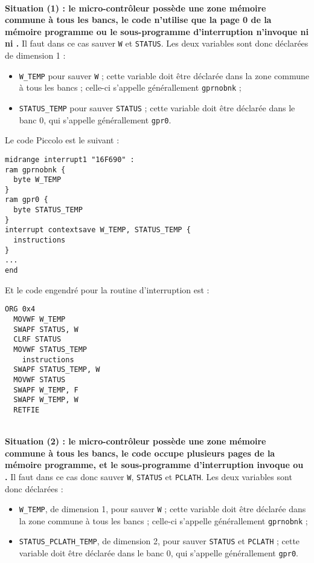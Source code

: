 ~\\
\textbf{Situation (1) : le micro-contrôleur possède une zone mémoire commune à tous les bancs, le code n'utilise que la page 0 de la mémoire programme ou le sous-programme d'interruption n'invoque ni  ni .} Il faut dans ce cas sauver \texttt{W} et \texttt{STATUS}. Les deux variables sont donc déclarées de dimension 1 :
\begin{itemize}
  \item \texttt{W\_TEMP} pour sauver \texttt{W} ; cette variable doit être déclarée dans la zone commune à tous les bancs ; celle-ci s'appelle générallement \texttt{gprnobnk} ; 
  \item \texttt{STATUS\_TEMP} pour sauver \texttt{STATUS} ; cette variable doit être déclarée dans le banc 0, qui s'appelle générallement \texttt{gpr0}. 
\end{itemize}


Le code Piccolo est le suivant :

\begin{lstlisting}[language=piccolo]
midrange interrupt1 "16F690" :
ram gprnobnk {
  byte W_TEMP
}
ram gpr0 {
  byte STATUS_TEMP  
}
interrupt contextsave W_TEMP, STATUS_TEMP {
  instructions
}
...
end
\end{lstlisting}

Et le code engendré pour la routine d'interruption est :
\begin{lstlisting}[language=assembleur]
  ORG 0x4
  MOVWF W_TEMP
  SWAPF STATUS, W
  CLRF STATUS
  MOVWF STATUS_TEMP
    instructions
  SWAPF STATUS_TEMP, W
  MOVWF STATUS
  SWAPF W_TEMP, F
  SWAPF W_TEMP, W
  RETFIE
\end{lstlisting}



~\\
\textbf{Situation (2) : le micro-contrôleur possède une zone mémoire commune à tous les bancs, le code occupe plusieurs pages de la mémoire programme, et le sous-programme d'interruption invoque  ou .} Il faut dans ce cas donc sauver \texttt{W}, \texttt{STATUS} et \texttt{PCLATH}. Les deux variables sont donc déclarées :
\begin{itemize}
  \item \texttt{W\_TEMP}, de dimension 1, pour sauver \texttt{W} ; cette variable doit être déclarée dans la zone commune à tous les bancs ; celle-ci s'appelle générallement \texttt{gprnobnk} ; 
  \item \texttt{STATUS\_PCLATH\_TEMP}, de dimension 2, pour sauver \texttt{STATUS} et  \texttt{PCLATH} ; cette variable doit être déclarée dans le banc 0, qui s'appelle générallement \texttt{gpr0}. 
\end{itemize}



